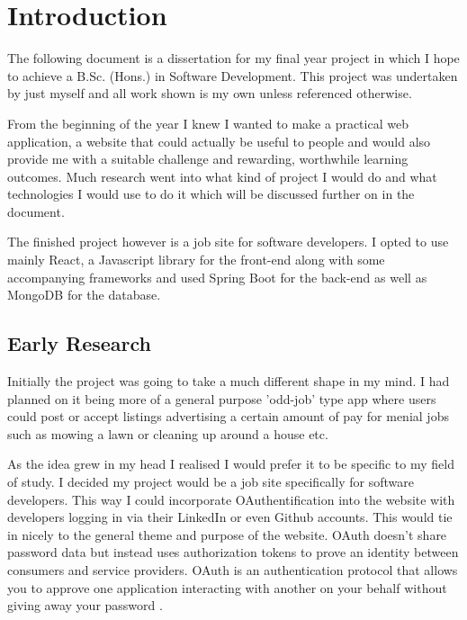 \chapter{Introduction}
The following document is a dissertation for my final year project in which I hope to achieve a B.Sc. (Hons.) in Software Development. This project was undertaken by just myself and all work shown is my own unless referenced otherwise.

From the beginning of the year I knew I wanted to make a practical web application, a website that could actually be useful to people and would also provide me with a suitable challenge and rewarding, worthwhile learning outcomes. Much research went into what kind of project I would do and what technologies I would use to do it which will be discussed further on in the document.

The finished project however is a job site for software developers. I opted to use mainly React, a Javascript library for the front-end along with some accompanying frameworks and used Spring Boot for the back-end as well as MongoDB for the database.

\section{Early Research}
Initially the project was going to take a much different shape in my mind. I had planned on it being more of a general purpose 'odd-job' type app where users could post or accept listings advertising a certain amount of pay for menial jobs such as mowing a lawn or cleaning up around a house etc.

As the idea grew in my head I realised I would prefer it to be specific to my field of study. I decided my project would be a job site specifically for software developers. This way I could incorporate OAuthentification into the website with developers logging in via their LinkedIn or even Github accounts. This would tie in nicely to the general theme and purpose of the website. OAuth doesn't share password data but instead uses authorization tokens to prove an identity between consumers and service providers. OAuth is an authentication protocol that allows you to approve one application interacting with another on your behalf without giving away your password \cite{OAuth}.

